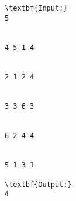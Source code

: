 \begin{verbatim}
\textbf{Input:}
5 


4 5 1 4 


2 1 2 4 


3 3 6 3 


6 2 4 4 


5 1 3 1

\textbf{Output:}
4
\end{verbatim}